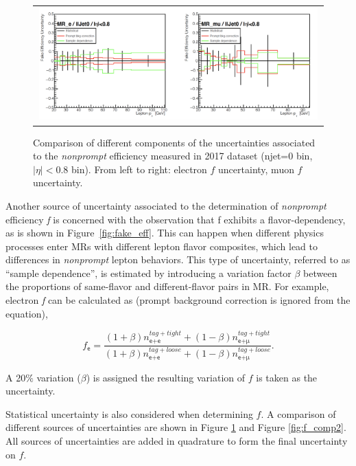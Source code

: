 \begin{figure}[tbh!]
 \begin{center}
 \begin{tabular}{c}
 \includegraphics[width=0.99\textwidth]{figures/Part3/Systematics/MR1}
 \end{tabular}
 \caption{Comparison of different components of the uncertainties associated to the \emph{nonprompt} efficiency measured in 2017 dataset (njet=0 bin, $|\eta|<$0.8 bin). From left to right: electron $f$ uncertainty, muon $f$ uncertainty.}
 \label{fig:f_comp1}
 \end{center}
\end{figure}

Another source of uncertainty associated to the determination of \emph{nonprompt} efficiency \emph{f} is concerned with the observation that f exhibits a flavor-dependency, as is shown in Figure~\ref{fig:fake_eff}. This can happen when different physics processes enter \acp{MR} with different lepton flavor composites, which lead to differences in \emph{nonprompt} lepton behaviors. This type of uncertainty, referred to as ``sample dependence'', is estimated by introducing a variation factor $\beta$ between the proportions of same-flavor and different-flavor pairs in \ac{MR}. For example, electron \emph{f} can be calculated as (prompt background correction is ignored from the equation),

\begin{equation}
f_{\textsf{e}}=\frac{(1+\beta)n_{\textsf{e+e}}^{tag+tight}+(1-\beta)n_{\textsf{e+}\upmu}^{tag+tight}}{(1+\beta)n_{\textsf{e+e}}^{tag+loose}+(1-\beta)n_{\textsf{e+}\upmu}^{tag+loose}}.
 \label{eq:samp_dep}
\end{equation}

A 20$\%$ variation ($\beta$) is assigned the resulting variation of $f$ is taken as the uncertainty.
 
Statistical uncertainty is also considered when determining $f$. A comparison of different sources of uncertainties are shown in Figure \ref{fig:f_comp1} and Figure \ref{fig:f_comp2}. All sources of uncertainties are added in quadrature to form the final uncertainty on $f$. 

